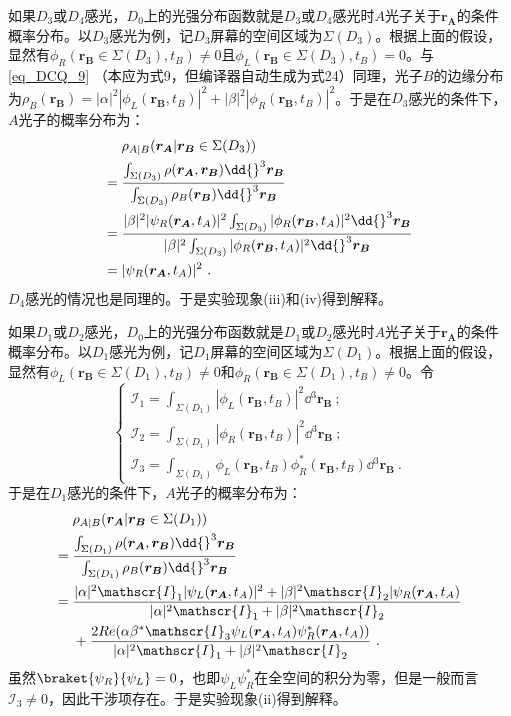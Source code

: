 如果$D_3$或$D_4$感光，$D_0$上的光强分布函数就是$D_3$或$D_4$感光时$A$光子关于$\boldsymbol{r_A}$的条件概率分布。以$D_3$感光为例，记$D_3$屏幕的空间区域为$\Sigma(D_3)$。根据上面的假设，显然有$\phi_R(\boldsymbol{r_B}\in\Sigma(D_3),t_B)\neq 0$且$\phi_L(\boldsymbol{r_B}\in\Sigma(D_3),t_B)=0$。与\autoref{eq_DCQ_9} （本应为式9，但编译器自动生成为式24）同理，光子$B$的边缘分布为$\rho_B(\boldsymbol{r_B})=|\alpha|^2|\phi_L(\boldsymbol{r_B},t_B)|^2+|\beta|^2|\phi_R(\boldsymbol{r_B},t_B)|^2$。于是在$D_3$感光的条件下，$A$光子的概率分布为：
\begin{align}
&\rho_{A|B}(\boldsymbol{r_A}|\boldsymbol{r_B}\in\Sigma(D_3)) \notag \\
={}&\frac{\int_{\Sigma(D_3)}\rho(\boldsymbol{r_A},\boldsymbol{r_B})\dd{}^3\boldsymbol{r_B}}{\int_{\Sigma(D_3)}\rho_B(\boldsymbol{r_B})\dd{}^3\boldsymbol{r_B}} \notag \\
={}&\frac{|\beta|^2|\psi_R(\boldsymbol{r_A},t_A)|^2\int_{\Sigma(D_3)}|\phi_R(\boldsymbol{r_B},t_A)|^2\dd{}^3\boldsymbol{r_B}}{|\beta|^2\int_{\Sigma(D_3)}|\phi_R(\boldsymbol{r_B},t_A)|^2\dd{}^3\boldsymbol{r_B}} \notag \\
={}&|\psi_R(\boldsymbol{r_A},t_A)|^2~.
\end{align}
$D_4$感光的情况也是同理的。于是实验现象(iii)和(iv)得到解释。

如果$D_1$或$D_2$感光，$D_0$上的光强分布函数就是$D_1$或$D_2$感光时$A$光子关于$\boldsymbol{r_A}$的条件概率分布。以$D_1$感光为例，记$D_1$屏幕的空间区域为$\Sigma(D_1)$。根据上面的假设，显然有$\phi_L(\boldsymbol{r_B}\in\Sigma(D_1),t_B)\neq 0$和$\phi_R(\boldsymbol{r_B}\in\Sigma(D_1),t_B)\neq 0$。令
\begin{equation}
	\begin{cases}
	\mathscr{I}_1=\int_{\Sigma(D_1)}|\phi_L(\boldsymbol{r_B},t_B)|^2\dd{}^3\boldsymbol{r_B}~; \\
	\mathscr{I}_2=\int_{\Sigma(D_1)}|\phi_R(\boldsymbol{r_B},t_B)|^2\dd{}^3\boldsymbol{r_B}~; \\
	\mathscr{I}_3=\int_{\Sigma(D_1)}\phi_L(\boldsymbol{r_B},t_B)\phi_R^*(\boldsymbol{r_B},t_B)\dd{}^3\boldsymbol{r_B}~.
	\end{cases}
\end{equation}
于是在$D_1$感光的条件下，$A$光子的概率分布为：
\begin{align}
&\rho_{A|B}(\boldsymbol{r_A}|\boldsymbol{r_B}\in\Sigma(D_1)) \notag \\
={}&\frac{\int_{\Sigma(D_1)}\rho(\boldsymbol{r_A},\boldsymbol{r_B})\dd{}^3\boldsymbol{r_B}}{\int_{\Sigma(D_1)}\rho_B(\boldsymbol{r_B})\dd{}^3\boldsymbol{r_B}} \notag \\
={}&\frac{|\alpha|^2\mathscr{I}_1|\psi_L(\boldsymbol{r_A},t_A)|^2+|\beta|^2\mathscr{I}_2|\psi_R(\boldsymbol{r_A},t_A)}{|\alpha|^2\mathscr{I}_1+|\beta|^2\mathscr{I}_2} \notag \\
&+\frac{2Re(\alpha\beta^*\mathscr{I}_3\psi_L(\boldsymbol{r_A},t_A)\psi_R^*(\boldsymbol{r_A},t_A))}{|\alpha|^2\mathscr{I}_1+|\beta|^2\mathscr{I}_2}~.
\end{align}
虽然$\braket{\psi_R}{\psi_L}=0$，也即$\psi_L\psi_R^*$在全空间的积分为零，但是一般而言$\mathscr{I}_3\neq 0$，因此干涉项存在。于是实验现象(ii)得到解释。

